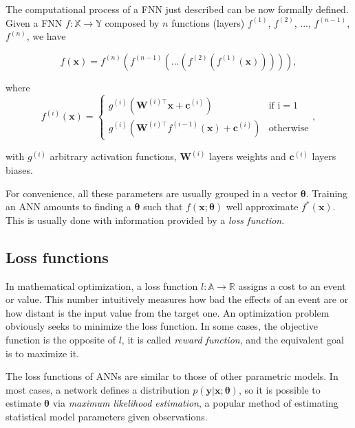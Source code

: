 The computational process of a FNN just described can be now formally defined. Given a FNN $f : \mathbb{X} \to \mathbb{Y}$ composed by $n$ functions (layers) $f^{(1)}$, $f^{(2)}$, ..., $f^{(n-1)}$, $f^{(n)}$, we have

\begin{equation}
\label{eq:ANN_compact}
f(\bm{x}) = f^{(n)}(f^{(n-1)}(...(f^{(2)}(f^{(1)}(\bm{x}))))),
\end{equation}

where
\begin{equation}
\label{eq:ANN_layers}
f^{(i)}(\bm{x}) =
\begin{cases}
    g^{(i)}(\bm{W}^{(i)\top} \bm{x} + \bm{c}^{(i)}) & \text{if i} = 1\\
    g^{(i)}(\bm{W}^{(i)\top} f^{(i-1)}(\bm{x}) + \bm{c}^{(i)}) & \text{otherwise}
\end{cases},
\end{equation}

with $g^{(i)}$ arbitrary activation functions, $\bm{W}^{(i)}$ layers weights and $\bm{c}^{(i)}$ layers biases.

For convenience, all these parameters are usually grouped in a vector $\bm{\theta}$. Training an ANN amounts to finding a $\bm{\theta}$ such that   $f(\bm{x}; \bm{\theta})$ well approximate $f^*(\bm{x})$. This is usually done with information provided by a \textit{loss function}.



\subsection{Loss functions}

In mathematical optimization, a loss function $l : \mathbb{A} \to \mathbb{R}$ assigns a cost to an event or value. This number intuitively measures how bad the effects of an event are or how distant is the input value from the target one. An optimization problem obviously seeks to minimize the loss function. In some cases, the objective function is the opposite of $l$, it is called \textit{reward function}, and the equivalent goal is to maximize it.

The loss functions of ANNs are similar to those of other parametric models. In most cases, a network defines a distribution $p(\bm{y} | \bm{x}; \bm{\theta})$, so it is possible to estimate $\bm{\theta}$ via \textit{maximum likelihood estimation}, a popular method of estimating statistical model parameters given observations. 

